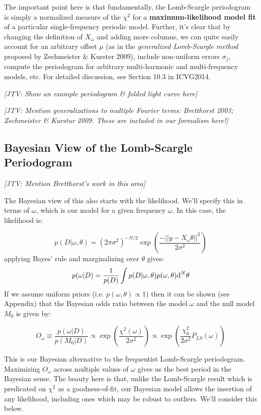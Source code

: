 \documentclass[12pt,pdftex]{article}
\newcommand{\jake}[1]{{\color{blue}\it[JTV: #1]}}
\begin{document}
The important point here is that fundamentally, the Lomb-Scargle periodogram is simply a normalized measure of the $\chi^2$ for a {\bf maximum-likelihood model fit} of a particular single-frequency periodic model. Further, it's clear that by changing the definition of $X_\omega$ and adding more columns, we can quite easily account for an arbitrary offset $\mu$ (as in the {\it generalized Lomb-Scargle method} proposed by Zechmeister \& Kurster 2009), include non-uniform errors $\sigma_j$, compute the periodogram for arbitrary multi-harmonic and multi-frequency models, etc. For detailed discussion, see Section 10.3 in ICVG2014.

\jake{Show an example periodogram \& folded light curve here}

\jake{Mention generalizations to multiple Fourier terms: Bretthorst 2003; Zechmeister \& Kurstur 2009. These are included in our formalism here!}


\subsection{Bayesian View of the Lomb-Scargle Periodogram}
\jake{Mention Bretthorst's work in this area}

The Bayesian view of this also starts with the likelihood.
We'll specify this in terms of $\omega$, which is our model for a given frequency $\omega$. In this case, the likelihood is:

\begin{equation}
  p(D|\omega,\theta) =
  (2\pi\sigma^2)^{-N/2} \exp\left(
  \frac{-||y - X_\omega\theta||^2}{2\sigma^2}
  \right)
\end{equation}
applying Bayes' rule and marginalizing over $\theta$ gives:
\begin{equation}
  p(\omega|D) = \frac{1}{p(D)}\int p(D|\omega,\theta)p(\omega, \theta){\rm d}^N\theta
\end{equation}
If we assume uniform priors (i.e. $p(\omega, \theta) \propto 1$) then it can be shown (see Appendix) that the Bayesian odds ratio between the model $\omega$ and the null model $M_0$ is given by:

\begin{equation}
  O_\omega \equiv \frac{p(\omega|D)}{p(M_0|D)} \propto \exp\left(\frac{\chi^2(\omega)}{2\sigma^2}\right) \propto \exp\left(\frac{\chi_0^2}{2\sigma^2}P_{LS}(\omega)\right)
\end{equation}


This is our Bayesian alternative to the frequentist Lomb-Scargle periodogram.
Maximizing $O_\omega$ across multiple values of $\omega$ gives us the best period in the Bayesian sense.
The beauty here is that, unlike the Lomb-Scargle result which is predicated on $\chi^2$ as a goodness-of-fit, our Bayesian model allows the insertion of any likelihood, including ones which may be robust to outliers. We'll consider this below.
\end{document}
